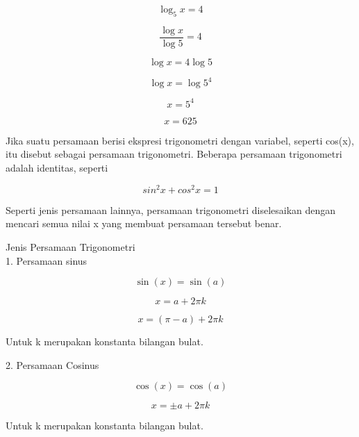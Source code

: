 \begin{eulernotebook}
\begin{eulercomment}
\begin{eulercomment}
\begin{eulercomment}
\end{eulercomment}
\begin{eulerformula}
\[
\log_{5}x=4
\]
\end{eulerformula}
\begin{eulerformula}
\[
\frac{\log x}{\log 5} = 4
\]
\end{eulerformula}
\begin{eulerformula}
\[
\log x = 4 \log 5
\]
\end{eulerformula}
\begin{eulerformula}
\[
\log x = \log 5^4
\]
\end{eulerformula}
\begin{eulerformula}
\[
x = 5^4
\]
\end{eulerformula}
\begin{eulerformula}
\[
x = 625
\]
\end{eulerformula}
\begin{eulercomment}
\end{eulercomment}
\begin{eulercomment}
Jika suatu persamaan berisi ekspresi trigonometri dengan variabel,
seperti cos(x), itu disebut sebagai persamaan trigonometri. Beberapa
persamaan trigonometri adalah identitas, seperti\\
\end{eulercomment}
\begin{eulerformula}
\[
sin^2 x+cos^2 x=1
\]
\end{eulerformula}
\begin{eulercomment}
Seperti jenis persamaan lainnya, persamaan trigonometri diselesaikan
dengan mencari semua nilai x yang membuat persamaan tersebut benar.

Jenis Persamaan Trigonometri\\
1. Persamaan sinus\\
\end{eulercomment}
\begin{eulerformula}
\[
\sin(x) = \sin(a)
\]
\end{eulerformula}
\begin{eulerformula}
\[
x = a + 2\pi k
\]
\end{eulerformula}
\begin{eulerformula}
\[
x = (\pi-a)+2\pi k
\]
\end{eulerformula}
\begin{eulercomment}
Untuk k merupakan konstanta bilangan bulat.

2. Persamaan Cosinus\\
\end{eulercomment}
\begin{eulerformula}
\[
\cos(x) = \cos(a)
\]
\end{eulerformula}
\begin{eulerformula}
\[
x = \pm a + 2\pi k
\]
\end{eulerformula}
\begin{eulercomment}
Untuk k merupakan konstanta bilangan bulat.


\end{eulercomment}
\end{eulercomment}
\end{eulercomment}
\end{eulernotebook}
